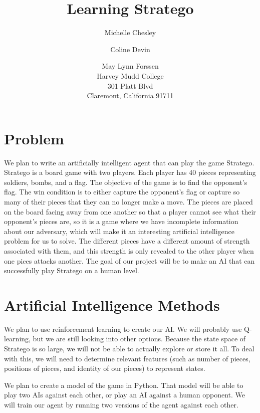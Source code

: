 \documentclass[letterpaper]{article}
\begin{document}
\title {Learning Stratego}
\author{Michelle Chesley \and Coline Devin \and May Lynn Forssen\\
Harvey Mudd College\\
301 Platt Blvd\\
Claremont, California 91711\\
}  
%
\maketitle

\section{Problem }
We plan to write an artificially intelligent agent that can play the game Stratego. Stratego is a board game with two players. Each player has 40 pieces representing soldiers, bombs, and a flag. The objective of the game is to find the opponent's flag. The win condition is to either capture the opponent's flag or capture so many of their pieces that they can no longer make a move. The pieces are placed on the board facing away from one another so that a player cannot see what their opponent's pieces are, so it is a game where we have incomplete information about our adversary, which will make it an interesting artificial intelligence problem for us to solve. The different pieces have a different amount of strength associated with them, and this strength is only revealed to the other player when one pices attacks another. The goal of our project will be to make an AI that can successfully play Stratego on a human level.

\section{Artificial Intelligence Methods}
We plan to use reinforcement learning to create our AI. We will probably use Q-learning, but we are still looking into other options. Because the state space of Stratego is so large, we will not be able to actually explore or store it all. To deal with this, we will need to determine relevant features (such as number of pieces, positions of pieces, and identity of our pieces) to represent states. 

We plan to create a model of the game in Python. That model will be able to play two AIs against each other, or play an AI against a human opponent. We will train our agent by running two versions of the agent against each other. 
\end{document}
